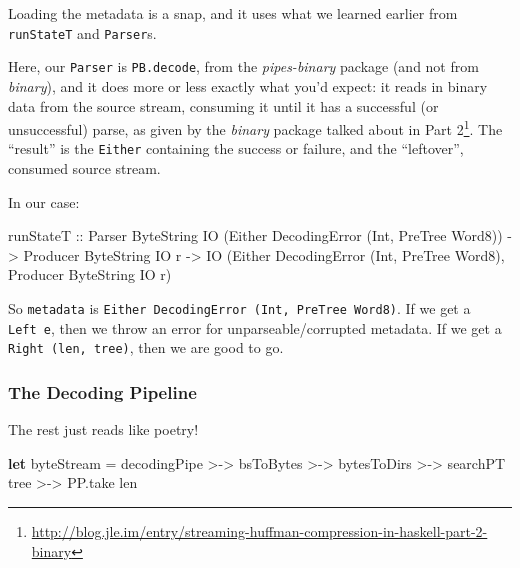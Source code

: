 \documentclass[]{article}
\newenvironment{Shaded}{}{}
\newcommand{\DataTypeTok}[1]{\textcolor[rgb]{0.56,0.13,0.00}{#1}}
\newcommand{\KeywordTok}[1]{\textcolor[rgb]{0.00,0.44,0.13}{\textbf{#1}}}
\newcommand{\NormalTok}[1]{#1}
\newcommand{\OperatorTok}[1]{\textcolor[rgb]{0.40,0.40,0.40}{#1}}
\newcommand{\OtherTok}[1]{\textcolor[rgb]{0.00,0.44,0.13}{#1}}
\renewcommand{\href}[2]{#2\footnote{\url{#1}}}
\begin{document}
Loading the metadata is a snap, and it uses what we learned earlier from
\texttt{runStateT} and \texttt{Parser}s.

Here, our \texttt{Parser} is \texttt{PB.decode}, from the \emph{pipes-binary}
package (and not from \emph{binary}), and it does more or less exactly what
you'd expect: it reads in binary data from the source stream, consuming it until
it has a successful (or unsuccessful) parse, as given by the \emph{binary}
package talked about in
\href{http://blog.jle.im/entry/streaming-huffman-compression-in-haskell-part-2-binary}{Part
2}. The ``result'' is the \texttt{Either} containing the success or failure, and
the ``leftover'', consumed source stream.

In our case:

\begin{Shaded}
\begin{Highlighting}[]
\NormalTok{runStateT}
\OtherTok{  ::} \DataTypeTok{Parser}   \DataTypeTok{ByteString} \DataTypeTok{IO}\NormalTok{ (}\DataTypeTok{Either} \DataTypeTok{DecodingError}\NormalTok{ (}\DataTypeTok{Int}\NormalTok{, }\DataTypeTok{PreTree} \DataTypeTok{Word8}\NormalTok{))}
  \OtherTok{{-}\textgreater{}} \DataTypeTok{Producer} \DataTypeTok{ByteString} \DataTypeTok{IO}\NormalTok{ r}
  \OtherTok{{-}\textgreater{}} \DataTypeTok{IO}\NormalTok{ (}\DataTypeTok{Either} \DataTypeTok{DecodingError}\NormalTok{ (}\DataTypeTok{Int}\NormalTok{, }\DataTypeTok{PreTree} \DataTypeTok{Word8}\NormalTok{), }\DataTypeTok{Producer} \DataTypeTok{ByteString} \DataTypeTok{IO}\NormalTok{ r)}
\end{Highlighting}
\end{Shaded}

So \texttt{metadata} is \texttt{Either\ DecodingError\ (Int,\ PreTree\ Word8)}.
If we get a \texttt{Left\ e}, then we throw an error for unparseable/corrupted
metadata. If we get a \texttt{Right\ (len,\ tree)}, then we are good to go.

\subsubsection{The Decoding Pipeline}\label{the-decoding-pipeline}

The rest just reads like poetry!

\begin{Shaded}
\begin{Highlighting}[]
\KeywordTok{let}\NormalTok{ byteStream }\OtherTok{=}\NormalTok{ decodingPipe }\OperatorTok{\textgreater{}{-}\textgreater{}}\NormalTok{ bsToBytes}
             \OperatorTok{\textgreater{}{-}\textgreater{}}\NormalTok{ bytesToDirs  }\OperatorTok{\textgreater{}{-}\textgreater{}}\NormalTok{ searchPT tree}
             \OperatorTok{\textgreater{}{-}\textgreater{}}\NormalTok{ PP.take len}
\end{Highlighting}
\end{Shaded}
\end{document}
